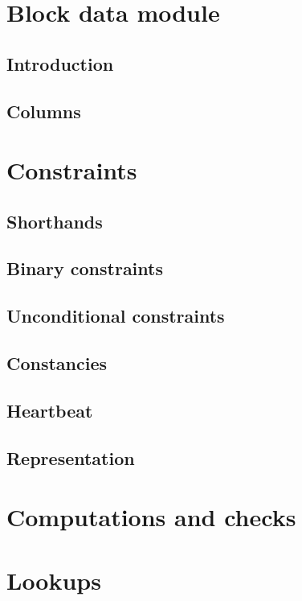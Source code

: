 

\section{Block data module}
\subsection{Introduction}                \label{block data: intro}                     
\subsection{Columns}                     \label{block data: columns}                   

\section{Constraints}
\subsection{Shorthands}                  \label{block data: shorthands}                
\subsection{Binary constraints}          \label{block data: binarities}                
\subsection{Unconditional constraints}   \label{block data: unconditional}             
\subsection{Constancies}                 \label{block data: constancies}               
\subsection{Heartbeat}                   \label{block data: heartbeat}                 
\subsection{Representation}              \label{block data: representation}            

\section{Computations and checks}        \label{block data: computations and checks}   

\section{Lookups}                        \label{block data: lookups}                   
